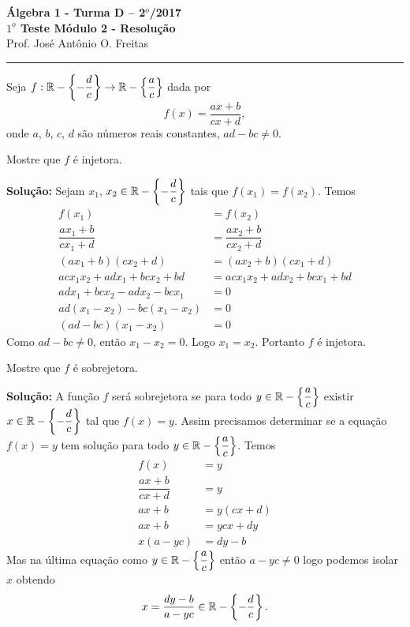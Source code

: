 \documentclass[12pt]{article}
\begin{document}


\begin{center}
{\Large\bf {\'A}lgebra 1 - Turma D -- 2$^{o}$/2017} \\ \vspace{9pt} {\large\bf
  $1^{\underline{o}}$ Teste Módulo 2 - Resolu\c{c}\~ao}\\
\vspace{9pt} Prof. Jos{\'e} Ant{\^o}nio O. Freitas
\end{center}
\hrule

\vspace{.6cm}

Seja $f : \mathbb{R} - \left\{-\dfrac{d}{c}\right\} \to \mathbb{R} - \left\{\dfrac{a}{c}\right\}$ dada por
\[
	f(x) =  \dfrac{ax + b}{cx + d},
\]
onde $a$, $b$, $c$, $d$ s{\~a}o n{\'u}meros reais constantes, $ad - bc \ne 0$.
\vspace{.5cm}

\questao Mostre que $f$ é injetora.

\noindent\textbf{Solu\c{c}\~ao:} Sejam $x_1$, $x_2 \in \mathbb{R} - \left\{-\dfrac{d}{c}\right\}$ tais que $f(x_1) = f(x_2)$. Temos
\begin{align*}
	f(x_1) &= f(x_2)\\
	\dfrac{ax_1 + b}{cx_1 + d} &= \dfrac{ax_2 + b}{cx_2 + d}\\
	(ax_1 + b)(cx_2 + d) &= (ax_2 + b)(cx_1 + d)\\
	acx_1x_2 + adx_1 + bcx_2 + bd &= acx_1x_2 + adx_2 + bcx_1 + bd\\
	adx_1 + bcx_2 - adx_2 - bcx_1 &= 0\\
	ad(x_1 - x_2) - bc(x_1 - x_2)&= 0\\
	(ad - bc)(x_1 - x_2) &= 0
\end{align*}
Como $ad - bc \ne 0$, então $x_1 - x_2 = 0$. Logo $x_1 = x_2$. Portanto $f$ é injetora.

\vspace{.5cm}

\questao Mostre que $f$ é sobrejetora.

\noindent\textbf{Solu\c{c}\~ao:} A função $f$ será sobrejetora se para todo $y \in \mathbb{R} - \left\{\dfrac{a}{c}\right\}$ existir $x \in \mathbb{R} - \left\{-\dfrac{d}{c}\right\}$ tal que $f(x) = y$. Assim precisamos determinar se a equação $f(x) = y$ tem solução para todo $y \in \mathbb{R} - \left\{\dfrac{a}{c}\right\}$.
Temos
\begin{align*}
	f(x) &= y\\
	\dfrac{ax + b}{cx + d} &= y\\
	ax + b &= y(cx + d)\\
	ax + b &= ycx + dy\\
	x(a - yc) &= dy - b
\end{align*}
Mas na última equação como $y \in \mathbb{R} - \left\{\dfrac{a}{c}\right\}$ então $a - yc \ne 0$ logo podemos isolar $x$ obtendo
\[
	x = \dfrac{dy - b}{a - yc} \in \mathbb{R} - \left\{-\dfrac{d}{c}\right\}.
\]
\end{document}
